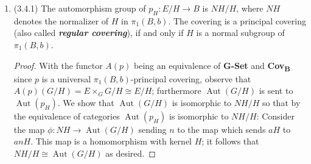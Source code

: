 \documentclass[11pt]{article}
\newcommand{\catname}[1]{{
  \textbf{#1}}}
\DeclareMathOperator{\Aut}{Aut}
\begin{document}
\begin{enumerate}
    \item (3.4.1) The automorphism group of $p_H\colon E/H\to B$ is $NH/H$, where $NH$ denotes the normalizer of $H$ in $\pi_1(B,b)$. The covering is a principal covering (also called \textit{\textbf{regular covering}}), if and only if $H$ is a normal subgroup of $\pi_1(B,b)$. \begin{proof}
      With the functor $A(p)$ being an equivalence of \catname{G-Set} and \catname{Cov}\textsubscript{\textbf{B}} since $p$ is a universal $\pi_1(B,b)$-principal covering, observe that $A(p)(G/H) = E\times_G G/H\cong E/H$; furthermore $\Aut(G/H)$ is sent to $\Aut(p_H)$. We show that $\Aut(G/H)$ is isomorphic to $NH/H$ so that by the equivalence of categories $\Aut(p_H)$ is isomorphic to $NH/H$: Consider the map $\phi\colon NH\to \Aut(G/H)$ sending $n$ to the map which sends $aH$ to $anH$. This map is a homomorphism with kernel $H$; it follows that $NH/H\cong \Aut(G/H)$ as desired. 
      

\end{proof}
\end{enumerate}
\end{document}
